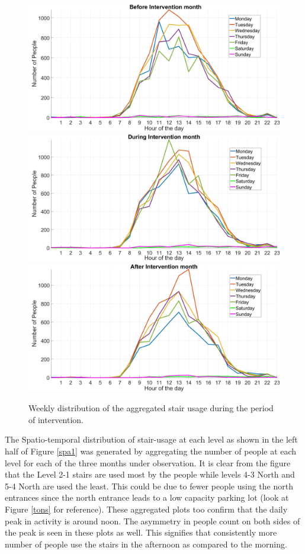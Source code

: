 \begin{figure}[tbp]
    \includegraphics[width=.49\textwidth]{image/Chapters/Chapter6/aggWeekPre.jpg}%
    \includegraphics[width=.49\textwidth]{image/Chapters/Chapter6/aggWeekInt.jpg}\hfill\centering
    \includegraphics[width=.49\textwidth]{image/Chapters/Chapter6/aggWeekpost.jpg}
    \caption{Weekly distribution of the aggregated stair usage during the period of intervention.}
    \label{spa2}
\end{figure}


The Spatio-temporal distribution of stair-usage at each level as shown in the left half of Figure \ref{spa1} was generated by aggregating the number of people at each level for each of the three months under observation. It is clear from the figure that the Level 2-1 stairs are used most by the people while levels 4-3 North and 5-4 North are used the least. This could be due to fewer people using the north entrances since the north entrance leads to a low capacity parking lot (look at Figure \ref{tons} for reference). These aggregated plots too confirm that the daily peak in activity is around noon. The asymmetry in people count on both sides of the peak is seen in these plots as well. This signifies that consistently more number of people use the stairs in the afternoon as compared to the morning. 

